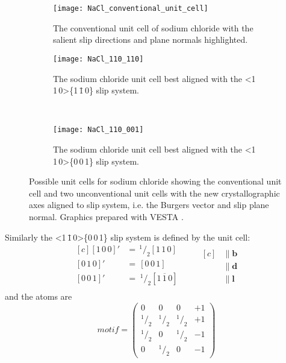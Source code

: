 \begin{figure}
\centering


    \begin{subfigure}{0.55\textwidth}
    \centering
    \texttt{[image: NaCl\_conventional\_unit\_cell]}
    \caption{The conventional unit cell of sodium chloride with the salient slip directions and plane normals highlighted. \label{fig:NaCl_conventional_cell_slip_system_marked}}
    \end{subfigure}

    \begin{subfigure}{0.4\textwidth}
    \centering
    \texttt{[image: NaCl\_110\_110]}
    \caption{The sodium chloride unit cell best aligned with the <1\,1\,0>\{1\,\={1}\,0\} slip system. \label{fig:NaCl_110_110_unit_cell}}
    \end{subfigure}
    ~
    \begin{subfigure}{0.4\textwidth}
    \centering
    \texttt{[image: NaCl\_110\_001]}
    \caption{The sodium chloride unit cell best aligned with the <1\,1\,0>\{0\,0\,1\} slip system. \label{fig:NaCl_110_001_unit_cell}}
    \end{subfigure}

\caption[Unconventional unit cells of rock salt to build a dislocation.]{Possible unit cells for sodium chloride showing the conventional unit cell and two unconventional unit cells with the new crystallographic axes aligned to slip system, i.e. the Burgers vector and slip plane normal. Graphics prepared with VESTA \cite{Momma2011}.\label{fig:unconventional_NaCl_unit_cells}}
\end{figure}






Similarly the  <1\,\={1}\,0>\{0\,0\,1\} slip system is defined by the unit cell:
\begin{equation*}
\begin{aligned}[c]
 {[1\,0\,0]}' &=\, ^{1}\!/_{2} [1\,1\,0] \\
 {[0\,1\,0]}' &=\,  [0\,0\,1] \\
 {[0\,0\,1]}' &=\; ^{1}\!/_{2} [1\,\overline{1}\,0] \\
\end{aligned}
\qquad
\begin{aligned}[c]
&\parallel \mathbf{b} \\
&\parallel \mathbf{d} \\
&\parallel \mathbf{l}
\end{aligned}
\end{equation*}
and the atoms are
$$
motif = \begin{pmatrix}
0 & 0 & 0 & +1 \\
^{1}\!/_{2} & ^{1}\!/_{2} & ^{1}\!/_{2} & +1 \\
^{1}\!/_{2} & 0 & ^{1}\!/_{2} & -1 \\
0 & ^{1}\!/_{2} & 0 & -1
\end{pmatrix}
$$


